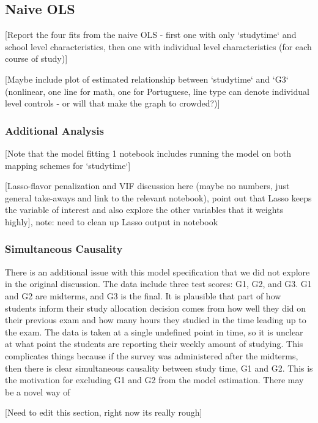 \documentclass[12pt]{article}
\begin{document}
\subsection{Naive OLS}
\textcolor{BrickRed}{[Report the four fits from the naive OLS - first one with only `studytime` and school level characteristics, then one with individual level characteristics (for each course of study)]}

\textcolor{BrickRed}{[Maybe include plot of estimated relationship between `studytime` and `G3` (nonlinear, one line for math, one for Portuguese, line type can denote individual level controls - or will that make the graph to crowded?)]}


\subsubsection{Additional Analysis}
\textcolor{BrickRed}{[Note that the model fitting 1 notebook includes running the model on both mapping schemes for `studytime`]}

\textcolor{BrickRed}{[Lasso-flavor penalization and VIF discussion here (maybe no numbers, just general take-aways and link to the relevant notebook), point out that Lasso keeps the variable of interest and also explore the other variables that it weights highly]}, note: need to clean up Lasso output in notebook

\subsubsection{Simultaneous Causality}
There is an additional issue with this model specification that we did not explore in the original discussion. The data include three test scores: G1, G2, and G3. G1 and G2 are midterms, and G3 is the final. It is plausible that part of how students inform their study allocation decision comes from how well they did on their previous exam and how many hours they studied in the time leading up to the exam. The data is taken at a single undefined point in time, so it is unclear at what point the students are reporting their weekly amount of studying. This complicates things because if the survey was administered after the midterms, then there is clear simultaneous causality between study time, G1 and G2. This is the motivation for excluding G1 and G2 from the model estimation. There may be a novel way of 

\textcolor{BrickRed}{[Need to edit this section, right now its really rough]}
\end{document}

